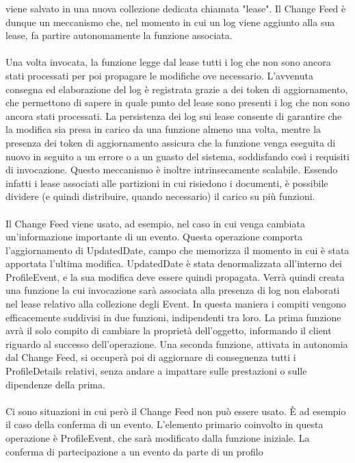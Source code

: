 viene salvato in una nuova collezione dedicata chiamata "lease".
Il Change Feed è dunque un meccanismo che,
nel momento in cui un log viene aggiunto alla sua lease,
fa partire autonomamente la funzione associata.\\
\\
Una volta invocata, 
la funzione legge dal lease tutti i log che non sono ancora stati processati
per poi propagare le modifiche ove necessario.
L'avvenuta consegna ed elaborazione del log è registrata grazie a dei token di aggiornamento, 
che permettono di sapere in quale punto del lease sono presenti i log che non sono ancora stati processati.
La persistenza dei log sui lease consente di garantire 
che la modifica sia presa in carico da una funzione almeno una volta,
mentre la presenza dei token di aggiornamento assicura 
che la funzione venga eseguita di nuovo in seguito a un errore o a un guasto del sistema, 
soddisfando così i requisiti di invocazione.
Questo meccanismo è inoltre intrinsecamente scalabile. 
Essendo infatti i lease associati alle partizioni in cui risiedono i documenti,
è possibile dividere (e quindi distribuire, quando necessario) il carico su più funzioni.\\
\\
Il Change Feed viene usato, ad esempio, 
nel caso in cui venga cambiata un'informazione importante di un evento.
Questa operazione comporta l'aggiornamento di UpdatedDate, 
campo che memorizza il momento in cui è stata apportata l'ultima modifica.
UpdatedDate è stata denormalizzata all'interno dei ProfileEvent,
e la sua modifica deve essere quindi propagata.
Verrà quindi creata una funzione la cui invocazione sarà associata
alla presenza di log non elaborati nel lease relativo alla collezione degli Event.
In questa maniera i compiti vengono efficacemente suddivisi in due funzioni,
indipendenti tra loro.
La prima funzione avrà il solo compito di cambiare la proprietà dell'oggetto,
informando il client riguardo al successo dell'operazione.
Una seconda funzione, attivata in autonomia dal Change Feed, 
si occuperà poi di aggiornare di conseguenza tutti i ProfileDetails relativi,
senza andare a impattare sulle prestazioni o sulle dipendenze della prima.\\
\\
Ci sono situazioni in cui però il Change Feed non può essere usato.
È ad esempio il caso della conferma di un evento.
L'elemento primario coinvolto in questa operazione è ProfileEvent, 
che sarà modificato dalla funzione iniziale.
La conferma di partecipazione a un evento da parte di un profilo 
